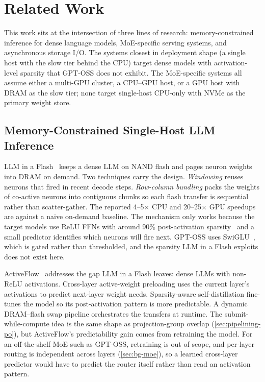 \chapter{Related Work}\label{chapter:related-work}

This work sits at the intersection of three lines of research: memory-constrained inference for dense language models, MoE-specific serving systems, and asynchronous storage I/O.
The systems closest in deployment shape (a single host with the slow tier behind the CPU) target dense models with activation-level sparsity that GPT-OSS does not exhibit.
The MoE-specific systems all assume either a multi-GPU cluster, a CPU--GPU host, or a GPU host with DRAM as the slow tier; none target single-host CPU-only with NVMe as the primary weight store.


\section{Memory-Constrained Single-Host LLM Inference}\label{sec:rw-mem-llm}

LLM in a Flash~\cite{alizadeh2024llmflash} keeps a dense LLM on NAND flash and pages neuron weights into DRAM on demand.
Two techniques carry the design.
\emph{Windowing} reuses neurons that fired in recent decode steps.
\emph{Row-column bundling} packs the weights of co-active neurons into contiguous chunks so each flash transfer is sequential rather than scatter-gather.
The reported 4--5$\times$ CPU and 20--25$\times$ GPU speedups are against a naive on-demand baseline.
The mechanism only works because the target models use ReLU FFNs with around 90\% post-activation sparsity~\cite{mirzadeh2023relu,liu2023deja} and a small predictor identifies which neurons will fire next.
GPT-OSS uses SwiGLU~\cite{shazeer2020glu,openai2025gptoss}, which is gated rather than thresholded, and the sparsity LLM in a Flash exploits does not exist here.

ActiveFlow~\cite{jia2025activeflow} addresses the gap LLM in a Flash leaves: dense LLMs with non-ReLU activations.
Cross-layer active-weight preloading uses the current layer's activations to predict next-layer weight needs.
Sparsity-aware self-distillation fine-tunes the model so its post-activation pattern is more predictable.
A dynamic DRAM--flash swap pipeline orchestrates the transfers at runtime.
The submit-while-compute idea is the same shape as projection-group overlap (\autoref{sec:pipelining-po}), but ActiveFlow's predictability gain comes from retraining the model.
For an off-the-shelf MoE such as GPT-OSS, retraining is out of scope, and per-layer routing is independent across layers (\autoref{sec:bg-moe}), so a learned cross-layer predictor would have to predict the router itself rather than read an activation pattern.

